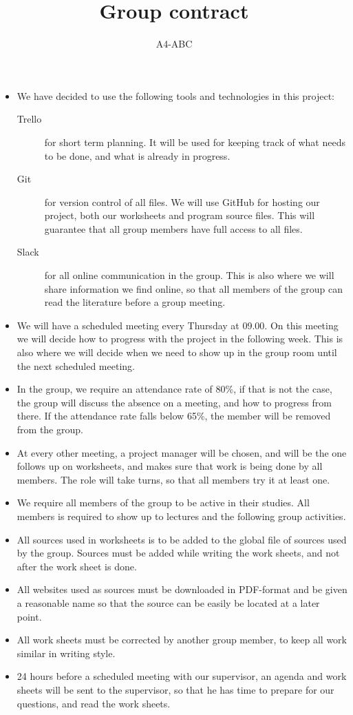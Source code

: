 \documentclass[a4paper,12pt,hidelinks]{article}
\newcommand{\group}{A4-ABC}
\begin{document}
	\title{Group contract}
	\author{\group}
	\maketitle

	\begin{itemize}
		\item We have decided to use the following tools and technologies in this project:
		\begin{description}
			\item[Trello] for short term planning. It will be used for keeping track of what needs to be done, and what is already in progress.
			\item[Git] for version control of all files. We will use GitHub for hosting our project, both our worksheets and program source files. This will guarantee that all group members have full access to all files.
			\item[Slack] for all online communication in the group. This is also where we will share information we find online, so that all members of the group can read the literature before a group meeting. 
		\end{description}
		\item We will have a scheduled meeting every Thursday at 09.00. On this meeting we will decide how to progress with the project in the following week. This is also where we will decide when we need to show up in the group room until the next scheduled meeting.
		\item In the group, we require an attendance rate of 80\%, if that is not the case, the group will discuss the absence on a meeting, and how to progress from there. If the attendance rate falls below 65\%, the member will be removed from the group.
		\item At every other meeting, a project manager will be chosen, and will be the one follows up on worksheets, and makes sure that work is being done by all members. The role will take turns, so that all members try it at least one.
		\item We require all members of the group to be active in their studies. All members is required to show up to lectures and the following group activities.
		\item All sources used in worksheets is to be added to the global file of sources used by the group. Sources must be added while writing the work sheets, and not after the work sheet is done. 
		\item All websites used as sources must be downloaded in PDF-format and be given a reasonable name so that the source can be easily be located at a later point.
		\item All work sheets must be corrected by another group member, to keep all work similar in writing style.
	\end{itemize}

	\begin{itemize}
		\item 24 hours before a scheduled meeting with our supervisor, an agenda and work sheets will be sent to the supervisor, so that he has time to prepare for our questions, and read the work sheets.
	\end{itemize}
\end{document}
